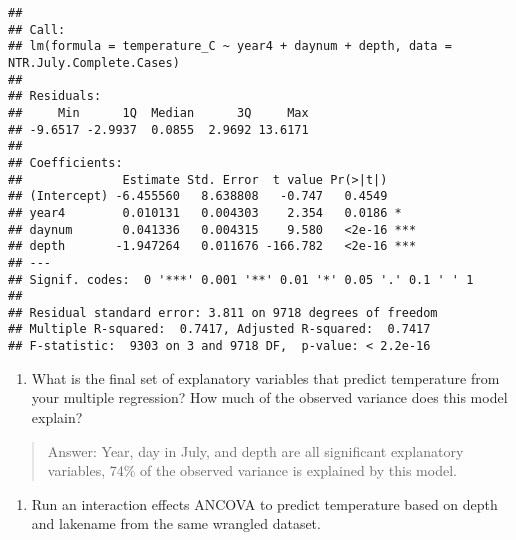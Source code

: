 \documentclass[]{article}
\newenvironment{Shaded}{\begin{snugshade}}{\end{snugshade}}
\newcommand{\CommentTok}[1]{\textcolor[rgb]{0.56,0.35,0.01}{\textit{#1}}}
\newcommand{\DataTypeTok}[1]{\textcolor[rgb]{0.13,0.29,0.53}{#1}}
\newcommand{\KeywordTok}[1]{\textcolor[rgb]{0.13,0.29,0.53}{\textbf{#1}}}
\newcommand{\NormalTok}[1]{#1}
\newcommand{\OperatorTok}[1]{\textcolor[rgb]{0.81,0.36,0.00}{\textbf{#1}}}
\newcommand{\StringTok}[1]{\textcolor[rgb]{0.31,0.60,0.02}{#1}}
\providecommand{\tightlist}{%
  \setlength{\itemsep}{0pt}\setlength{\parskip}{0pt}}
\begin{document}
\begin{Shaded}
\end{Shaded}

\begin{verbatim}
## 
## Call:
## lm(formula = temperature_C ~ year4 + daynum + depth, data = NTR.July.Complete.Cases)
## 
## Residuals:
##     Min      1Q  Median      3Q     Max 
## -9.6517 -2.9937  0.0855  2.9692 13.6171 
## 
## Coefficients:
##              Estimate Std. Error  t value Pr(>|t|)    
## (Intercept) -6.455560   8.638808   -0.747   0.4549    
## year4        0.010131   0.004303    2.354   0.0186 *  
## daynum       0.041336   0.004315    9.580   <2e-16 ***
## depth       -1.947264   0.011676 -166.782   <2e-16 ***
## ---
## Signif. codes:  0 '***' 0.001 '**' 0.01 '*' 0.05 '.' 0.1 ' ' 1
## 
## Residual standard error: 3.811 on 9718 degrees of freedom
## Multiple R-squared:  0.7417, Adjusted R-squared:  0.7417 
## F-statistic:  9303 on 3 and 9718 DF,  p-value: < 2.2e-16
\end{verbatim}

\begin{enumerate}
\def\labelenumi{\arabic{enumi}.}
\setcounter{enumi}{4}
\tightlist
\item
  What is the final set of explanatory variables that predict
  temperature from your multiple regression? How much of the observed
  variance does this model explain?
\end{enumerate}

\begin{quote}
Answer: Year, day in July, and depth are all significant explanatory
variables, 74\% of the observed variance is explained by this model.
\end{quote}

\begin{enumerate}
\def\labelenumi{\arabic{enumi}.}
\setcounter{enumi}{5}
\tightlist
\item
  Run an interaction effects ANCOVA to predict temperature based on
  depth and lakename from the same wrangled dataset.
\end{enumerate}
\end{document}
